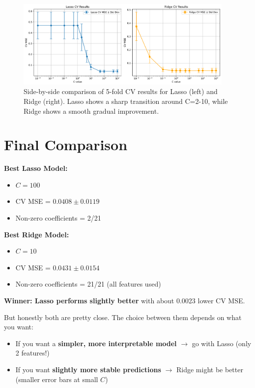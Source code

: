 \documentclass[11pt,a4paper]{article}
\begin{document}
\begin{figure}[H]
\centering
\includegraphics[width=0.95\textwidth]{figures/07_lasso_ridge_cv_comparison.png}
\caption{Side-by-side comparison of 5-fold CV results for Lasso (left) and Ridge (right). Lasso shows a sharp transition around C=2-10, while Ridge shows a smooth gradual improvement.}
\label{fig:cv_comparison}
\end{figure}

\section*{Final Comparison}

\textbf{Best Lasso Model:}
\begin{itemize}
    \item $C = 100$
    \item CV MSE = $0.0408 \pm 0.0119$
    \item Non-zero coefficients = 2/21
\end{itemize}

\textbf{Best Ridge Model:}
\begin{itemize}
    \item $C = 10$
    \item CV MSE = $0.0431 \pm 0.0154$
    \item Non-zero coefficients = 21/21 (all features used)
\end{itemize}

\textbf{Winner: Lasso performs slightly better} with about 0.0023 lower CV MSE.

But honestly both are pretty close. The choice between them depends on what you want:
\begin{itemize}
    \item If you want a \textbf{simpler, more interpretable model} $\rightarrow$ go with Lasso (only 2 features!)
    \item If you want \textbf{slightly more stable predictions} $\rightarrow$ Ridge might be better (smaller error bars at small $C$)
\end{itemize}
\end{document}
